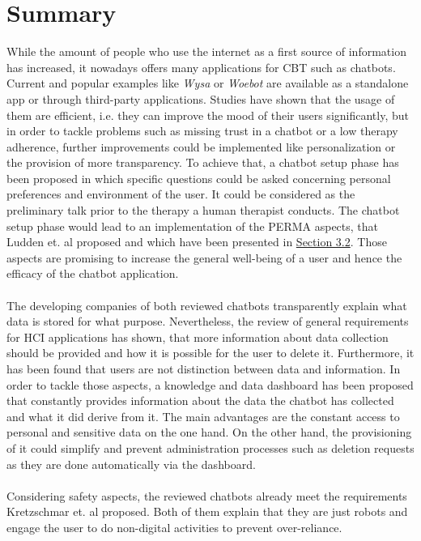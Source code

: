 \documentclass[sigconf, nonacm]{acmart}
\begin{document}
\section{Summary}
\label{sec:five}
While the amount of people who use the internet as a first source of information has increased\cite{Wyatt2015}, it nowadays offers many applications for CBT such as chatbots. 
\\
Current and popular examples like \emph{Wysa} or \emph{Woebot} are available as a standalone app or through third-party applications. Studies have shown that the usage of them are efficient, i.e. they can improve the mood of their users significantly\cite{Fitzpatrick2017,Inkster}, but in order to tackle problems such as missing trust in a chatbot or a low therapy adherence, further improvements could be implemented like personalization 
or the provision of more transparency. To achieve that, a chatbot setup phase has been proposed in which specific questions could be asked concerning personal preferences and environment of the user. It could be considered as the preliminary talk prior to the therapy a human therapist conducts.
The chatbot setup phase would lead to an implementation of the PERMA aspects, that Ludden et. al \cite{Ludden2015} proposed and which have been presented in \hyperref[sec:three_two]{Section 3.2}. Those aspects are promising to increase the general well-being of a user and hence the efficacy of the chatbot application.
\\\\
The developing companies of both reviewed chatbots transparently explain what data is stored for what purpose.
Nevertheless, the review of general requirements for HCI applications has shown, that more information about data collection should be provided and how it is possible for the user to delete it\cite{Saglam2021}.
Furthermore, it has been found that users are not distinction between data and information\cite{Lee2011}.
In order to tackle those aspects, a knowledge and data dashboard has been proposed that constantly provides information about the data the chatbot has collected and what it did derive from it.
The main advantages are the constant access to personal and sensitive data on the one hand. On the other hand, the provisioning of it could simplify and prevent administration processes such as deletion requests as they are done automatically via the dashboard.
\\\\
Considering safety aspects, the reviewed chatbots already meet the requirements Kretzschmar et. al \cite{Kretzschmar2019} proposed. Both of them explain that they are just robots and engage the user to do non-digital activities to prevent over-reliance.
\end{document}
